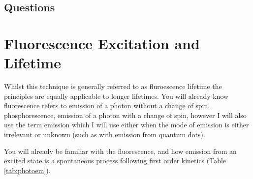 \documentclass[
]{book}
\begin{document}
\hypertarget{questions-2}{%
\section{Questions}\label{questions-2}}

\hypertarget{ch:fluorlif}{%
\chapter{Fluorescence Excitation and Lifetime}\label{ch:fluorlif}}

Whilst this technique is generally referred to as fluroescence lifetime the principles are equally applicable to longer lifetimes. You will already know fluorescence refers to emission of a photon without a change of spin, phosphorescence, emission of a photon with a change of spin, however I will also use the term emission which I will use either when the mode of emission is either irrelevant or unknown (such as with emission from quantum dots).

You will already be familiar with the fluorescence, and how emission from an excited state is a spontaneous process following first order kinetics (Table \ref{tab:photoem}).
\end{document}
